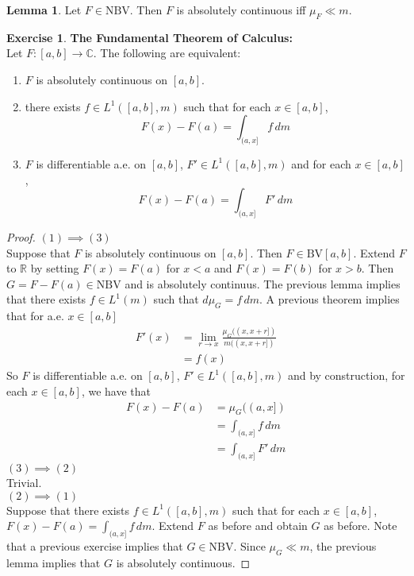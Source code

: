 \documentclass[12pt]{amsart}
\theoremstyle{definition}
\newtheorem{lem}[definition]{Lemma}
\newtheorem{ex}[definition]{Exercise}
\newcommand{\C}{\mathbb{C}}
\newcommand{\R}{\mathbb{R}}
\newcommand{\dm}{\, d m}
\newcommand{\BV}{\text{BV}}
\newcommand{\NBV}{\text{NBV}}
\newcommand{\lex}[1]{\label{ex:#1}}
\begin{document}
	\begin{lem}
		Let $F \in \NBV$. Then $F$ is absolutely continuous iff $\mu_F \ll m$.
	\end{lem}
	
	\begin{ex} \lex{00000} \textbf{The Fundamental Theorem of Calculus:}\\
		Let $F:[a,b] \rightarrow \C$. The following are equivalent:
		\begin{enumerate}
			\item $F$ is absolutely continuous on $[a,b]$.
			\item there exists $f \in L^1([a,b], m)$ such that for each $x \in [a,b]$, 
			$$F(x)-F(a)= \int_{(a,x]}f\dm$$
			\item $F$ is differentiable a.e. on $[a,b]$, $F' \in L^1([a,b], m)$ and for each $x \in [a,b]$, 
			$$F(x)-F(a)=\int_{(a,x]}F'\dm$$
		\end{enumerate}
	\end{ex}
	
	\begin{proof}
		$(1) \implies (3)$ \\
		Suppose that $F$ is absolutely continuous on $[a,b]$. Then $F \in \BV[a,b]$. Extend $F$ to $\R$ by setting $F(x) = F(a)$ for $x<a$ and $F(x)=F(b)$ for $x>b$. Then $G=F-F(a) \in \NBV$ and is absolutely continuus. The previous lemma implies that there exists $f \in L^1(m)$ such that $d \mu_G = f\dm$. A previous theorem implies that for a.e. $x \in [a,b]$
		\begin{align*}
			F'(x) 
			&= \lim_{r \rightarrow x} \frac{\mu_G((x,x+r])}{m((x,x+r])}\\
			&= f(x)
		\end{align*}  
		So $F$ is differentiable a.e. on $[a,b]$, $F' \in L^1([a,b], m)$ and by construction, for each $x \in [a,b]$, we have that
		\begin{align*}
			F(x)-F(a)
			&= \mu_G((a,x])\\
			&= \int_{(a,x]}f\dm\\
			&= \int_{(a,x]}F'\dm
		\end{align*}
		$(3) \implies (2)$\\
		Trivial.\\
		$(2) \implies (1)$\\
		Suppose that there exists $f \in L^1([a,b], m)$ such that for each $x \in [a,b]$, $F(x)-F(a)=\int_{(a,x]}f\dm$. Extend $F$ as before and obtain $G$ as before. Note that a previous exercise implies that $G \in \NBV$. Since $\mu_G \ll m$, the previous lemma implies that $G$ is absolutely continuous.
	\end{proof}
	
\end{document}
